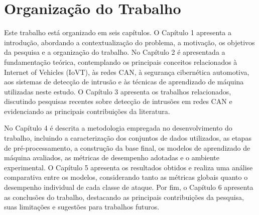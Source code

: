 \section{Organização do Trabalho}

Este trabalho está organizado em seis capítulos. O Capítulo 1 apresenta a introdução, abordando a contextualização do problema, a motivação, os objetivos da pesquisa e a organização do trabalho. No Capítulo 2 é apresentada a fundamentação teórica, contemplando os principais conceitos relacionados à Internet of Vehicles (IoVT), às redes CAN, à segurança cibernética automotiva, aos sistemas de detecção de intrusão e às técnicas de aprendizado de máquina utilizadas neste estudo. O Capítulo 3 apresenta os trabalhos relacionados, discutindo pesquisas recentes sobre detecção de intrusões em redes CAN e evidenciando as principais contribuições da literatura.

No Capítulo 4 é descrita a metodologia empregada no desenvolvimento do trabalho, incluindo a caracterização dos conjuntos de dados utilizados, as etapas de pré-processamento, a construção da base final, os modelos de aprendizado de máquina avaliados, as métricas de desempenho adotadas e o ambiente experimental. O Capítulo 5 apresenta os resultados obtidos e realiza uma análise comparativa entre os modelos, considerando tanto as métricas globais quanto o desempenho individual de cada classe de ataque. Por fim, o Capítulo 6 apresenta as conclusões do trabalho, destacando as principais contribuições da pesquisa, suas limitações e sugestões para trabalhos futuros.








